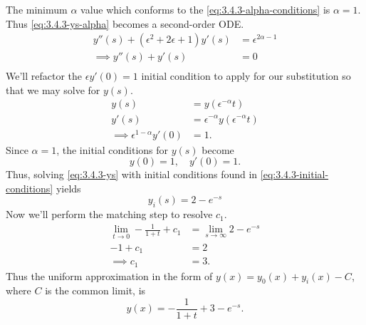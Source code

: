 \documentclass[12pt,twoside]{article}
\begin{document}
The minimum $\alpha$ value which conforms to the
\cref{eq:3.4.3-alpha-conditions} is $\alpha=1$. Thus \cref{eq:3.4.3-ys-alpha}
becomes a second-order ODE.\@
\begin{equation}
  \label{eq:3.4.3-ys}
  \begin{aligned}
    y''(s) + (\epsilon^{2}+2\epsilon+1)y'(s) &= \epsilon^{2\alpha-1} \\
    \implies y''(s) + y'(s) &= 0 \\
  \end{aligned}
\end{equation}
We'll refactor the $\epsilon y'(0)=1$ initial condition to apply for our
substitution so that we may solve for $y(s)$.
\begin{equation*}
  \begin{aligned}
    y(s) &= y(\epsilon^{-\alpha}t) \\
    y'(s) &= \epsilon^{-\alpha}y(\epsilon^{-\alpha}t) \\
    \implies \epsilon^{1-\alpha}y'(0) &= 1.
  \end{aligned}
\end{equation*}
Since $\alpha=1$, the initial conditions for $y(s)$ become
\begin{equation}
  \label{eq:3.4.3-initial-conditions}
  y(0) = 1,\quad y'(0) = 1.
\end{equation}
Thus, solving \cref{eq:3.4.3-ys} with initial conditions found in
\cref{eq:3.4.3-initial-conditions} yields
\begin{equation*}
  \boxed{y_i(s) = 2-e^{-s}}
\end{equation*}
Now we'll perform the matching step to resolve $c_1$.
\begin{equation*}
  \begin{aligned}
    \lim_{t\rightarrow0}-\frac{1}{1+t}+c_1 &= \lim_{s\rightarrow\infty}2-e^{-s} \\
    -1+c_1 &= 2 \\
    \implies c_1 &= 3.
  \end{aligned}
\end{equation*}
Thus the uniform approximation in the form of $y(x)=y_0(x)+y_i(x)-C$, where $C$
is the common limit, is
\begin{equation*}
  \boxed{y(x)=-\frac{1}{1+t}+3-e^{-s}.}
\end{equation*}
\end{document}
